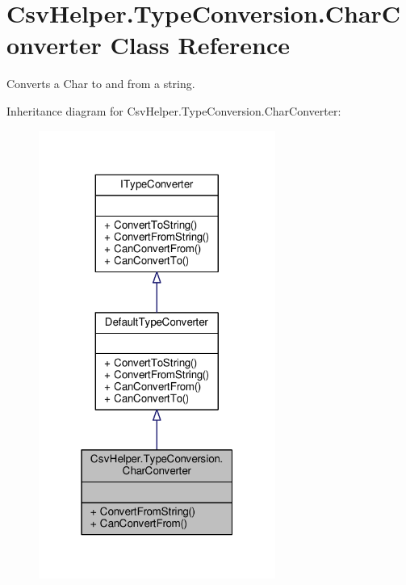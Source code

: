 \hypertarget{a00046}{\section{Csv\-Helper.\-Type\-Conversion.\-Char\-Converter Class Reference}
\label{a00046}
}


Converts a Char to and from a string.  




Inheritance diagram for Csv\-Helper.\-Type\-Conversion.\-Char\-Converter\-:
\nopagebreak
\begin{figure}[H]
\begin{center}
\leavevmode
\includegraphics[width=220pt]{a00486}
\end{center}
\end{figure}


